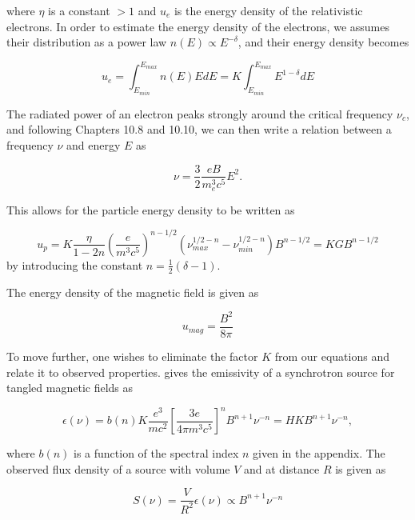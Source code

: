 where $\eta$ is a constant $>1$ and $u_e$ is the energy density of the relativistic electrons. In order to estimate the energy density of the electrons, we assumes their distribution as a power law $n(E) \propto E^{-\delta}$, and their energy density becomes

\begin{equation}
    u_e = \int_{E_{min}}^{E_{max}} n(E) E dE = K \int_{E_{min}}^{E_{max}} E^{1-\delta }dE
\end{equation}

The radiated power of an electron peaks strongly around the critical frequency $\nu_c$, and following \cite{2013Wilson} Chapters 10.8 and 10.10, we can then write a relation between a frequency $\nu$ and energy $E$ as

\begin{equation}
    \nu = \frac{3}{2}\frac{eB}{m_e^3 c^5}E^2.
\end{equation}

This allows for the particle energy density to be written as

\begin{equation}
    \label{eq:energy_density_particles}
    u_p = K \frac{\eta}{1-2n} \left(\frac{e}{m^3c^5}\right)^{n-1/2}\left(\nu_{max}^{1/2-n}-\nu_{min}^{1/2-n}\right) B^{n-1/2} = K G B^{n-1/2}
\end{equation}
by introducing the constant $n = \frac{1}{2}(\delta -1 )$. 

The energy density of the magnetic field is given as

\begin{equation}
    u_{mag} = \frac{B^2}{8\pi}
\end{equation}

To move further, one wishes to eliminate the factor $K$ from our equations and relate it to observed properties. \cite{2013Wilson} gives the emissivity of a synchrotron source for tangled magnetic fields as

\begin{equation}
    \epsilon(\nu) = b(n)K \frac{e^3}{m c^2}\left[\frac{3 e}{4 \pi m^3 c^5}\right]^{n} B^{n+1} \nu^{-n} = H K B^{n+1} \nu^{-n},
\end{equation}

where $b(n)$ is a function of the spectral index $n$ given in the appendix. The observed flux density of a source with volume $V$ and at distance $R$ is given as

\begin{equation}
    \label{eq:flux_density_eq}
    S(\nu) = \frac{V}{R^2} \epsilon(\nu) \propto B^{n+1} \nu^{-n}
\end{equation}

